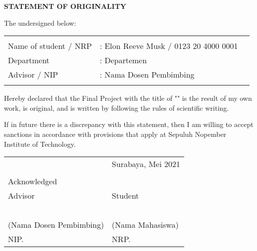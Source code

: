 \begin{center}
  \large
  \textbf{STATEMENT OF ORIGINALITY}
\end{center}

\thispagestyle{empty}

\vspace{2ex}


\noindent The undersigned below:

\noindent\begin{tabularx}{\textwidth}{X X l}
  & \\
  Name of student / NRP &: Elon Reeve Musk / 0123 20 4000 0001 \\
  Department &: Departemen \\
  Advisor / NIP &: Nama Dosen Pembimbing \\
  & \\
\end{tabularx}

Hereby declared that the Final Project with the title of "" is the result of my own work, is original, and is written by following the rules of scientific writing.

If in future there is a discrepancy with this statement, then I am willing to accept sanctions in accordance with provisions that apply at Sepuluh Nopember Institute of Technology.

\vspace{8ex}

\noindent\begin{tabularx}{\textwidth}{X l}
  & Surabaya, Mei 2021\\
  & \\
  Acknowledged & \\
  Advisor & Student\\
  & \\
  & \\
  & \\
  & \\
  & \\
  (Nama Dosen Pembimbing) & (Nama Mahasiswa) \\
  NIP. & NRP. \\
\end{tabularx}